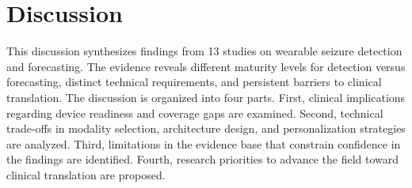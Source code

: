 
\section{Discussion}
\label{sec:discussion}

This discussion synthesizes findings from 13 studies on wearable seizure detection and forecasting. The evidence reveals different maturity levels for detection versus forecasting, distinct technical requirements, and persistent barriers to clinical translation. The discussion is organized into four parts. First, clinical implications regarding device readiness and coverage gaps are examined. Second, technical trade-offs in modality selection, architecture design, and personalization strategies are analyzed. Third, limitations in the evidence base that constrain confidence in the findings are identified. Fourth, research priorities to advance the field toward clinical translation are proposed.





